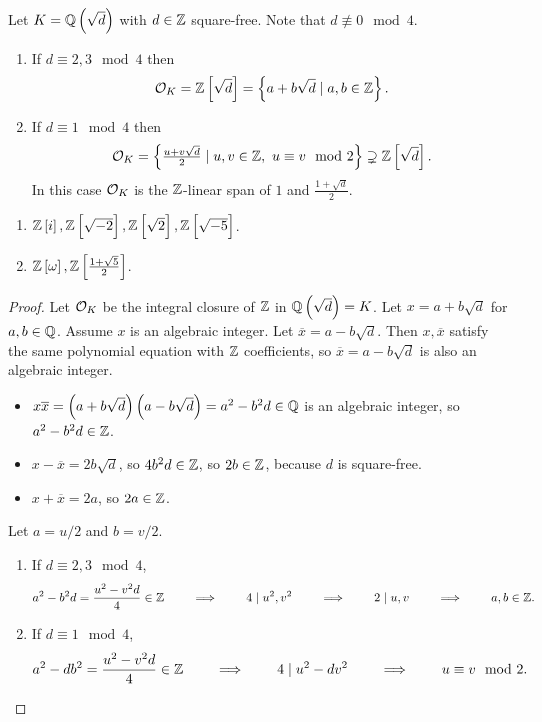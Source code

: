 \begin{theorem}
Let $ K = \Q\br{\sqrt{d}} $ with $ d \in \mathbb{Z} $ square-free. Note that $ d \not\equiv 0 \mod 4 $.
\begin{enumerate}
\item If $ d \equiv 2, 3 \mod 4 $ then
$$ \OO_K = \Z\sbr{\sqrt{d}} = \cbr{a + b\sqrt{d} \mid a, b \in \Z}. $$
\item If $ d \equiv 1 \mod 4 $ then
$$ \OO_K = \cbr{\tfrac{u + v\sqrt{d}}{2} \mid u, v \in \Z, \ u \equiv v \mod 2} \supsetneq \Z\sbr{\sqrt{d}}. $$
In this case $ \mathcal{O}_K $ is the $ \mathbb{Z} $-linear span of $ 1 $ and $ \tfrac{1 + \sqrt{d}}{2} $.
\end{enumerate}
\end{theorem}

\begin{example*}
\hfill
\begin{enumerate}
\item $ \Z\sbr{i}, \Z\sbr{\sqrt{-2}}, \Z\sbr{\sqrt{2}}, \Z\sbr{\sqrt{-5}} $.
\item $ \Z\sbr{\omega}, \Z\sbr{\tfrac{1 + \sqrt{5}}{2}} $.
\end{enumerate}
\end{example*}

\begin{proof}
Let $ \mathcal{O}_K $ be the integral closure of $ \mathbb{Z} $ in $ \Q\br{\sqrt{d}} = K $. Let $ x = a + b\sqrt{d} $ for $ a, b \in \mathbb{Q} $. Assume $ x $ is an algebraic integer. Let $ \overline{x} = a - b\sqrt{d} $. Then $ x, \overline{x} $ satisfy the same polynomial equation with $ \mathbb{Z} $ coefficients, so $ \overline{x} = a - b\sqrt{d} $ is also an algebraic integer.
\begin{itemize}
\item $ x\overline{x} = \br{a + b\sqrt{d}}\br{a - b\sqrt{d}} = a^2 - b^2d \in \Q $ is an algebraic integer, so $ a^2 - b^2d \in \mathbb{Z} $.
\item $ x - \overline{x} = 2b\sqrt{d} $, so $ 4b^2d \in \mathbb{Z} $, so $ 2b \in \mathbb{Z} $, because $ d $ is square-free.
\item $ x + \overline{x} = 2a $, so $ 2a \in \mathbb{Z} $.
\end{itemize}
Let $ a = u / 2 $ and $ b = v / 2 $.
\begin{enumerate}
\item If $ d \equiv 2, 3 \mod 4 $,
$$ a^2 - b^2d = \dfrac{u^2 - v^2d}{4} \in \mathbb{Z} \qquad \implies \qquad 4 \mid u^2, v^2 \qquad \implies \qquad 2 \mid u, v \qquad \implies \qquad a, b \in \mathbb{Z}. $$
\item If $ d \equiv 1 \mod 4 $,
$$ a^2 - db^2 = \dfrac{u^2 - v^2d}{4} \in \mathbb{Z} \qquad \implies \qquad 4 \mid u^2 - dv^2 \qquad \implies \qquad u \equiv v \mod 2. $$
\end{enumerate}
\end{proof}

